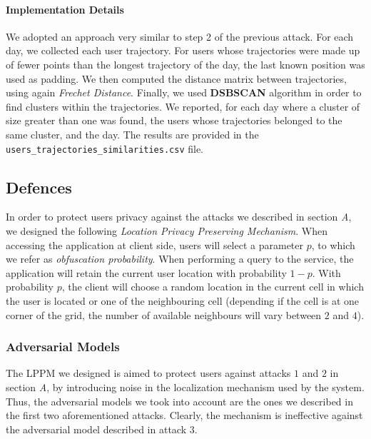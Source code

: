 \documentclass[10pt,conference,compsocconf]{IEEEtran}
\begin{document}
\paragraph{Implementation Details}
We adopted an approach very similar to step 2 of the previous attack. For each
day, we collected each user trajectory. For users whose trajectories were made
up of fewer points than the longest trajectory of the day, the last known
position was used as padding. We then computed the distance matrix between
trajectories, using again \textit{Frechet Distance}. Finally, we used
\textbf{DSBSCAN} algorithm in order to find clusters within the trajectories. We
reported, for each day where a cluster of size greater than one was found, the
users whose trajectories belonged to the same cluster, and the day. The results
are provided in the \texttt{users\_trajectories\_similarities.csv} file.


\subsection{Defences}
In order to protect users privacy against the attacks we described in section
\textit{A}, we designed the following \textit{Location Privacy Preserving
Mechanism}. When accessing the application at client side, users will select a
parameter $p$, to which we refer as \textit{obfuscation probability}. When
performing a query to the service, the application will retain the current user
location with probability $1-p$. With probability $p$, the client will choose a
random location in the current cell in which the user is located or one of the
neighbouring cell (depending if the cell is at one corner of the grid, the
number of available neighbours will vary between $2$ and $4$).
\subsubsection{Adversarial Models}
The LPPM we designed is aimed to protect users against attacks $1$ and $2$ in
section \textit{A}, by introducing noise in the localization mechanism used by
the system. Thus, the adversarial models we took into account are the ones we
described in the first two aforementioned attacks. Clearly, the mechanism is ineffective
against the adversarial model described in attack $3$.
\end{document}
